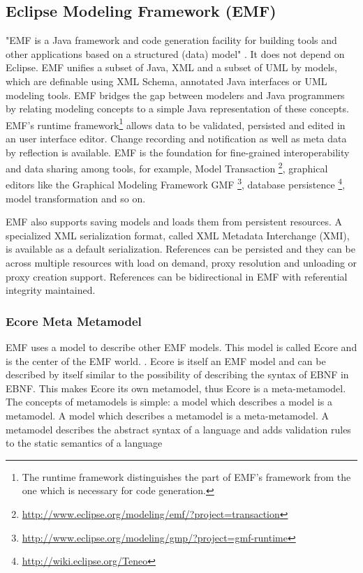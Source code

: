 \subsection{Eclipse Modeling Framework (EMF) }
"EMF is a Java framework and code generation facility for building tools and other applications based on a structured (data) model" \cite{EMFDoc}. 
It does not depend on Eclipse. EMF unifies a subset of Java, XML and a subset of UML by models, which are definable using XML Schema, annotated Java interfaces or UML modeling tools. EMF bridges the gap between modelers and Java programmers by relating modeling concepts to a simple Java representation of these concepts. \cite{EMF2nd}\\

EMF's runtime framework\footnote{\raggedright The runtime framework distinguishes the part of EMF's framework from the one which is necessary for code generation.} allows data to be validated, persisted and edited in an user interface editor. Change recording and notification as well as meta data by reflection is available. EMF is the foundation for fine-grained interoperability and data sharing among tools, for example, Model Transaction \footnote{\raggedright \url{http://www.eclipse.org/modeling/emf/?project=transaction}}, graphical editors like the Graphical Modeling Framework GMF \footnote{\raggedright \url{http://www.eclipse.org/modeling/gmp/?project=gmf-runtime}}, database persistence \footnote{\raggedright \url{http://wiki.eclipse.org/Teneo}}, model transformation and so on.

EMF also supports saving models and loads them from persistent resources. A specialized XML serialization format, called XML Metadata Interchange (XMI), is available as a default serialization. References can be persisted and they can be across multiple resources with load on demand, proxy resolution and unloading or proxy creation support. References can be bidirectional in EMF with referential integrity maintained. \cite{EMF2nd}\\

\subsubsection{Ecore Meta Metamodel} \label{ecore}
EMF uses a model to describe other EMF models. This model is called Ecore and is the center of the EMF world. . Ecore is itself an EMF model and can be described by itself similar to the possibility of describing the syntax of EBNF in EBNF. This makes Ecore its own metamodel, thus Ecore is a meta-metamodel. The concepts of metamodels is simple: a model which describes a model is a metamodel. A model which describes a metamodel is a meta-metamodel. \cite{EMF2nd}  A metamodel describes the abstract syntax of a language \cite{EMP} and adds validation rules to the static semantics of a language \cite{MDSD}

